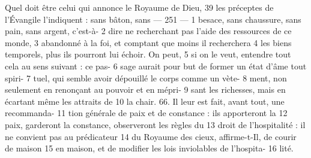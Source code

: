 Quel doit être celui qui annonce le Royaume de Dieu,	 
39	 	les préceptes de l'Évangile l'indiquent : sans bâton, sans	 
 	--- 251 ---	 
1	 	besace, sans chaussure, sans pain, sans argent, c'est-à-	 
2	 	dire ne recherchant pas l'aide des ressources de ce monde,	 
3	 	abandonné à la foi, et comptant que moins il recherchera	 
4	 	les biens temporels, plus ils pourront lui échoir. On peut,	 
5	 	si on le veut, entendre tout cela au sens suivant : ce pas-	 
6	 	sage aurait pour but de former un état d'âme tout spiri-	 
7	 	tuel, qui semble avoir dépouillé le corps comme un vète-	 
8	 	ment, non seulement en renonçant au pouvoir et en mépri-	 
9	 	sant les richesses, mais en écartant même les attraits de	 
10	 	la chair. 66. Il leur est fait, avant tout, une recommanda-	 
11	 	tion générale de paix et de constance : ils apporteront la	 
12	 	paix, garderont la constance, observeront les règles du	 
13	 	droit de l'hospitalité : il ne convient pas au prédicateur	 
14	 	du Royaume des cieux, affirme-t-Il, de courir de maison	 
15	 	en maison, et de modifier les lois inviolables de l'hospita-	 
16	 	lité.